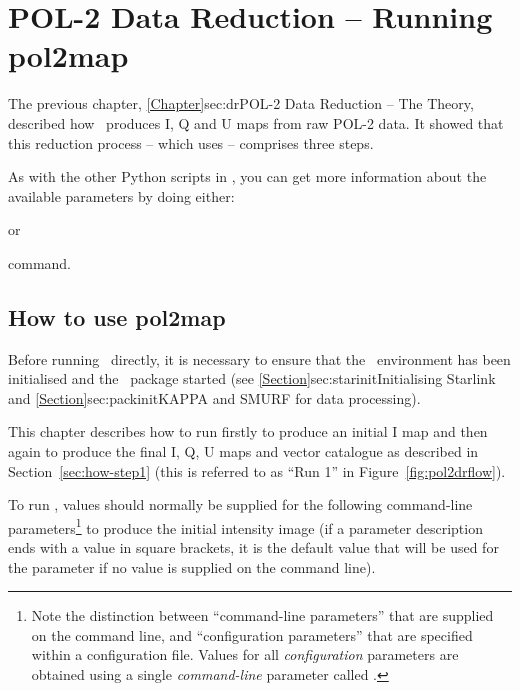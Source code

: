 \chapter{POL-2 Data Reduction -- Running
  pol2map}
\label{sec:rundr}

The previous chapter, \cref{Chapter}{sec:dr}{POL-2 Data Reduction --
  The Theory}, described how \poltwomap\ produces I, Q and U maps from raw
POL-2 data.  It showed that this reduction process -- which uses
 -- comprises three steps.

As with the other Python scripts in \SMURF, you can get more
information about the available parameters by doing either:
\begin{terminalv}
\end{terminalv}
or
\begin{terminalv}
\end{terminalv}
command.

\section{How to use pol2map}

Before running \poltwomap\ directly, it is necessary to ensure that
the \starlink\ environment has been initialised and the \smurf\
package started (see \cref{Section}{sec:starinit}{Initialising
  Starlink} and \cref{Section}{sec:packinit}{KAPPA and SMURF for data
  processing}).

This chapter describes how to run  firstly to produce an
initial I map and then again to produce the final I, Q, U maps and
vector catalogue as described in Section~\ref{sec:how-step1}
(this is referred to as ``Run 1'' in Figure~\ref{fig:pol2drflow}).

To run , values should normally be supplied for the following
command-line parameters\footnote{Note the distinction between
  ``command-line parameters'' that are supplied on the
   command line, and ``configuration parameters'' that
  are specified within a configuration file. Values for all
  \emph{configuration} parameters are obtained using a single
  \emph{command-line} parameter called .} to produce
the initial intensity image (if a parameter description ends with a value
in square brackets, it is the default value that will be used for
the parameter if no value is supplied on the command line).

